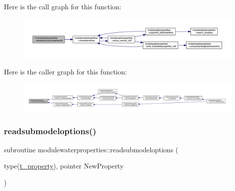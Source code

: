 Here is the call graph for this function\+:\nopagebreak
\begin{figure}[H]
\begin{center}
\leavevmode
\includegraphics[width=350pt]{namespacemodulewaterproperties_ab37c7ef1af4bcefaf38220a0ce3fdf12_cgraph}
\end{center}
\end{figure}
Here is the caller graph for this function\+:\nopagebreak
\begin{figure}[H]
\begin{center}
\leavevmode
\includegraphics[width=350pt]{namespacemodulewaterproperties_ab37c7ef1af4bcefaf38220a0ce3fdf12_icgraph}
\end{center}
\end{figure}
\mbox{\label{namespacemodulewaterproperties_a5a214d6f2f108bf67d3db3df4165609d}} 
\subsubsection{\texorpdfstring{readsubmodeloptions()}{readsubmodeloptions()}}
{\footnotesize\ttfamily subroutine modulewaterproperties\+::readsubmodeloptions (\begin{DoxyParamCaption}\item[{type(\mbox{\hyperlink{structmodulewaterproperties_1_1t__property}{t\+\_\+property}}), pointer}]{New\+Property }\end{DoxyParamCaption})\hspace{0.3cm}{\ttfamily [private]}}

